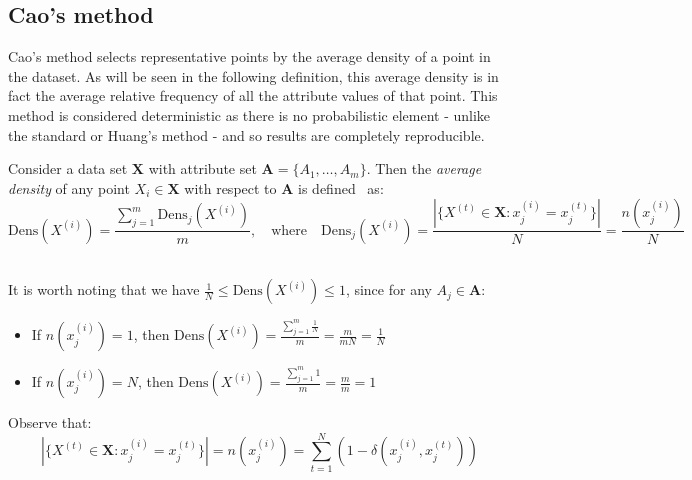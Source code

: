 \subsection{Cao's method}\label{subsec:cao}

Cao's method selects representative points by the average density of a point in
the dataset. As will be seen in the following definition, this average density 
is in fact the average relative frequency of all the attribute values of that 
point. This method is considered deterministic as there is no probabilistic 
element - unlike the standard or Huang's method - and so results are completely
reproducible.\\

\begin{definition}\label{def:density}	
    Consider a data set \(\textbf{X}\) with attribute set \(\textbf{A} = 
    \{A_1, \ldots, A_m\}\). Then the \emph{average density} of any point 
    \(X_i \in \textbf{X}\) with respect to \(\textbf{A}\) is 
    defined~\cite{Cao09} as:
	\[
	    \text{Dens}(X^{(i)}) = \frac{\sum_{j=1}^m \text{Dens}_{j}(X^{(i)})}{m}, 
        \quad \text{where} \quad \text{Dens}_{j}(X^{(i)}) = \frac{|\{X^{(t)} \in 
        \textbf{X} : x_j^{(i)} = x_j^{(t)}\}|}{N} = \frac{n(x_j^{(i)})}{N}
	\]\\
\end{definition}

\begin{remark}
    It is worth noting that we have \(\frac{1}{N} \leq \text{Dens}(X^{(i)})
    \leq 1\), since for any \(A_j \in \textbf{A}\):		
	\begin{itemize}	
        \item If \(n(x_j^{(i)}) = 1\), then \(\text{Dens}(X^{(i)}) = 
			\frac{\sum_{j=1}^m \frac{1}{N}}{m} = \frac{m}{mN} = \frac{1}{N}\)
        \item If \(n(x_j^{(i)}) = N\), then \(\text{Dens}(X^{(i)}) = 
            \frac{\sum_{j=1}^m 1}{m} = \frac{m}{m} = 1\)\\
	\end{itemize}
\end{remark}

\noindent Observe that:
\[
	|\{X^{(t)} \in \textbf{X} : x_j^{(i)} = x_j^{(t)}\}| = n(x_j^{(i)}) = 
	\sum_{t=1}^N (1 - \delta(x_j^{(i)}, x_j^{(t)}))
\]\\

